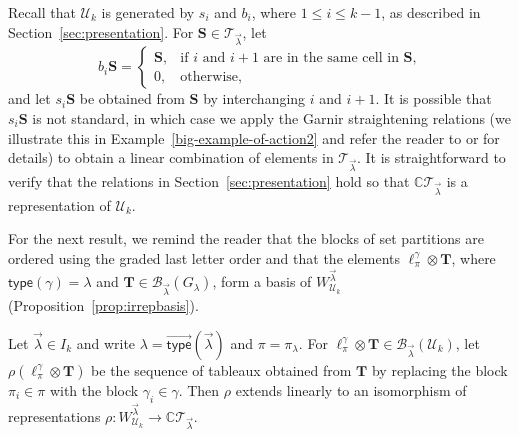 \documentclass[ALCO,Unicode]{cedram}
\newcommand{\CC}{\mathbb C}
\newcommand{\vtype}{\overrightarrow{\mathsf{type}}}
\begin{document}
Recall that $\mathcal{U}_k$ is generated by $s_i$ and $b_i$,
where $1\leqslant i \leqslant k-1$, as described in Section~\ref{sec:presentation}. For $\mathbf{S}\in \mathcal{T}_{\vec{\lambda}}$,
let
\begin{equation}
    \label{bi-action-on-S}
    b_i \mathbf{S} = \begin{cases} \mathbf{S}, & \text{if $i$ and $i+1$ are in the same cell in $\mathbf{S}$,}\\
    0, & \text{otherwise,}\end{cases}
\end{equation}
and let $s_i\mathbf{S}$ be obtained from $\mathbf{S}$ by interchanging $i$ and $i+1$. It is possible that
$s_i \mathbf{S}$ is not standard, in which case we apply the Garnir straightening relations
(we illustrate this in Example~\ref{big-example-of-action2} and refer the reader
to \cite[Section 2.6]{Sagan.2001} or \cite{CarreLascouxLeclerc} for details)
to obtain a linear combination of elements in $\mathcal{T}_{\vec{\lambda}}$.
It is straightforward to verify that the relations in Section~\ref{sec:presentation} hold
so that $\mathbb{C}\mathcal{T}_{\vec{\lambda}}$ is a representation of $\mathcal{U}_k$.

For the next result, we remind the reader that the blocks of set partitions are
ordered using the graded last letter order and that
the elements $\ell_\pi^\gamma \otimes \mathbf{T}$, where $\mathsf{type}(\gamma)
= \lambda$ and $\mathbf{T} \in \mathcal{B}_{\vec{\lambda}}(G_\lambda)$,
form a basis of $W^{\vec{\lambda}}_{\mathcal{U}_k}$ (Proposition~\ref{prop:irrepbasis}).
\begin{theorem}\label{th:tableauxmodule}
Let $\vec{\lambda}\in I_k$ and write $\lambda = \vtype(\vec{\lambda})$ and $\pi = \pi_\lambda$.
For $\ell_{\pi}^\gamma \otimes \mathbf{T} \in \mathcal{B}_{\vec{\lambda}}(\mathcal{U}_k)$, let
$\rho(\ell_{\pi}^\gamma \otimes \mathbf{T})$ be the sequence of tableaux obtained
from $\mathbf{T}$ by replacing the block $\pi_i\in \pi$ with the block $\gamma_i\in \gamma$.
Then $\rho$ extends linearly to an isomorphism of representations
$\rho \colon W^{\vec{\lambda}}_{\mathcal{U}_k}\rightarrow \CC\mathcal{T}_{\vec{\lambda}}$.
\end{theorem}
\end{document}
